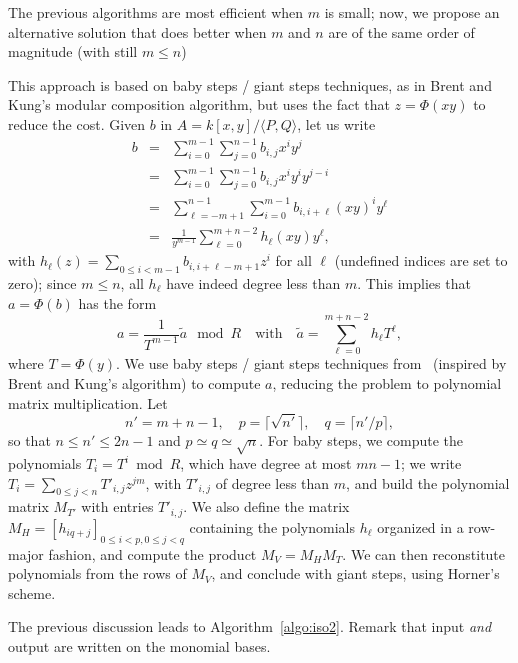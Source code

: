 \documentclass{sig-alternate}
\newcounter{algo}
\newcommand{\ang}[1]{\langle#1\rangle}
\begin{document}
  The previous
algorithms are most efficient when $m$ is small; now, we propose an
alternative solution that does better when $m$ and $n$ are of the same
order of magnitude (with still $m \le n$)

This approach is based on baby steps / giant steps techniques, as in
Brent and Kung's modular composition algorithm, but uses the fact that
$z=\Phi(xy)$ to reduce the cost. Given $b$ in $A=k[x,y]/\ang{P,Q}$,
let us write
\begin{eqnarray*}
b&=&\sum_{i=0}^{m-1}\sum_{j=0}^{n-1} b_{i,j}x^i y^j\\
&=&\sum_{i=0}^{m-1}\sum_{j=0}^{n-1} b_{i,j}x^i y^i y^{j-i}\\
&=&\sum_{\ell=-m+1}^{n-1}\sum_{i=0}^{m-1} b_{i,i+\ell}(xy)^i y^\ell\\
&=&\frac{1}{y^{m-1}} \sum_{\ell=0}^{m+n-2} h_\ell(xy) y^\ell,
\end{eqnarray*}
with $h_\ell(z)=\sum_{0 \le i < m-1} b_{i,i+\ell-m+1} z^i$ for all
$\ell$ (undefined indices are set to zero); since $m \le n$, all
$h_\ell$ have indeed degree less than $m$. This implies that
$a=\Phi(b)$ has the form
$$a = \frac{1}{T^{m-1}}\widetilde{a} \mod R\quad\text{with}\quad
\widetilde{a}=\sum_{\ell=0}^{m+n-2} h_\ell T^\ell,$$ where
$T=\Phi(y)$.  We use baby steps / giant steps techniques
from~\cite{LeMeSc13} (inspired by Brent and Kung's algorithm) to
compute $a$, reducing the problem to polynomial matrix
multiplication. Let
$$n'=m+n-1,\quad p=\lceil \sqrt {n'} \rceil,\quad q=\lceil
n'/p\rceil,$$ so that $n \le n' \le 2n-1$ and $p\simeq q \simeq
\sqrt{n}$.  For baby steps, we compute the polynomials $T_i=T^i \bmod
R$, which have degree at most $mn-1$; we write $T_i = \sum_{0 \le j <
  n} T'_{i,j} z^{jm}$, with $T'_{i,j}$ of degree less than $m$, and
build the polynomial matrix $M_{T'}$ with entries $T'_{i,j}$.  We also
define the matrix $M_H=[h_{iq+j}]_{0 \le i <p, 0 \le j < q}$
containing the polynomials $h_\ell$ organized in a row-major fashion,
and compute the product $M_V=M_H M_T$. We can then reconstitute
polynomials from the rows of $M_V$, and conclude with giant steps,
using Horner's scheme.

The previous discussion leads to Algorithm~\ref{algo:iso2}. Remark
that input {\em and} output are written on the monomial bases.
\end{document}
